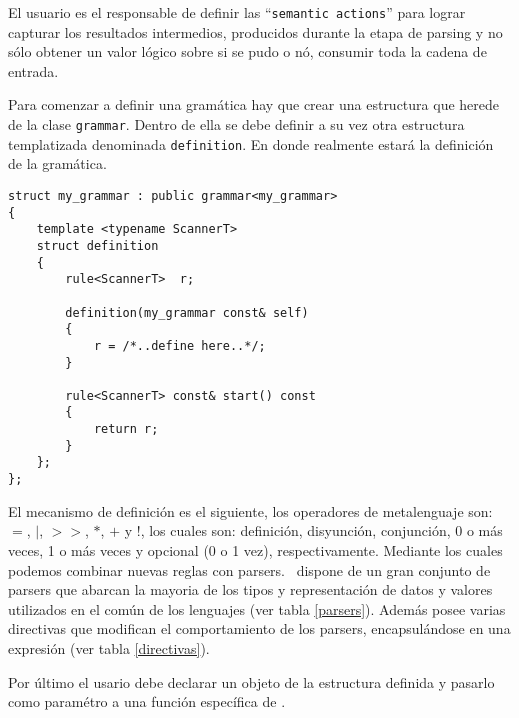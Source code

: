El usuario es el responsable de definir las ``\texttt{semantic actions}'' para lograr capturar los resultados intermedios, producidos durante la etapa de parsing y no sólo obtener un valor lógico sobre si se pudo o nó, consumir toda la cadena de entrada.

Para comenzar a definir una gramática hay que crear una estructura que herede de la clase \texttt{grammar}. Dentro de ella se debe definir a su vez otra estructura templatizada denominada \texttt{definition}. En donde realmente estará la definición de la gramática.

\begin{center}\lstset{language=C++}
\scriptsize
\begin{lstlisting}
struct my_grammar : public grammar<my_grammar>
{
    template <typename ScannerT>
    struct definition
    {
        rule<ScannerT>  r;

        definition(my_grammar const& self)
        {
            r = /*..define here..*/;
        }

        rule<ScannerT> const& start() const
        {
            return r;
        }
    };
};
\end{lstlisting}\end{center}

El mecanismo de definición es el siguiente, los operadores de metalenguaje son: \textbf{\texttt{$=$}}, \textbf{\texttt{$|$}}, \textbf{\texttt{$>>$}}, \textbf{\texttt{$*$}}, \textbf{\texttt{$+$}} y \textbf{\texttt{$!$}}, los cuales son: definición, disyunción, conjunción, 0 o más veces, 1 o más veces y opcional (0 o 1 vez), respectivamente. Mediante los cuales podemos combinar nuevas reglas con parsers. \spirit\ dispone de un gran conjunto de parsers que abarcan la mayoria de los tipos y representación de datos y valores utilizados en el común de los lenguajes (ver tabla \ref{parsers}). Además posee varias directivas que modifican el comportamiento de los parsers, encapsulándose en una expresión (ver tabla \ref{directivas}).

Por último el usario debe declarar un objeto de la estructura definida y pasarlo como paramétro a una función específica de \spirit.

